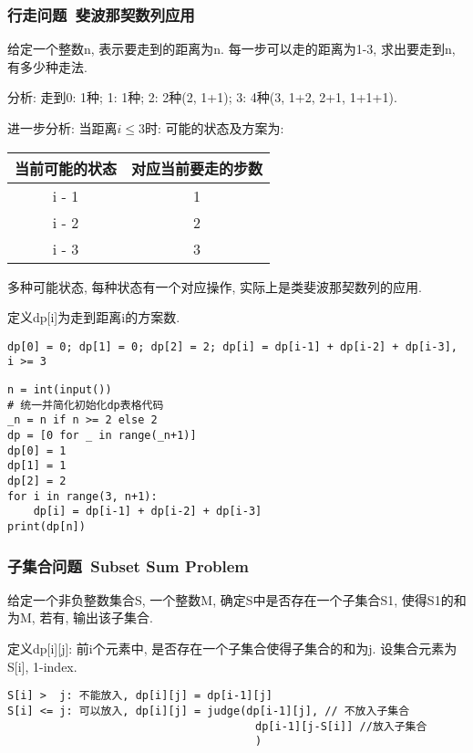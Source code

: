 \documentclass[../main]{subfiles}
\begin{document}
\begin{sloppy}
\subsubsection{行走问题\ 斐波那契数列应用}

给定一个整数n, 表示要走到的距离为n. 每一步可以走的距离为1-3, 求出要走到n, 有多少种走法.

分析: 走到0: 1种; 1: 1种; 2: 2种(2, 1+1); 3: 4种(3, 1+2, 2+1, 1+1+1).

进一步分析: 当距离$i \leq 3$时: 可能的状态及方案为: 
\begin{table}[htbp]
    \centering
    \begin{tabular}{c|c}
        \toprule
        当前可能的状态 & 对应当前要走的步数 \\
        \midrule
        i - 1 & 1 \\
        i - 2 & 2 \\ 
        i - 3 & 3 \\
        \bottomrule
    \end{tabular}
\end{table}

多种可能状态, 每种状态有一个对应操作, 实际上是类斐波那契数列的应用. 

定义dp[i]为走到距离i的方案数. 
\begin{verbatim}
dp[0] = 0; dp[1] = 0; dp[2] = 2; dp[i] = dp[i-1] + dp[i-2] + dp[i-3], i >= 3
\end{verbatim}

\begin{lstlisting}[style = Python]
n = int(input())
# 统一并简化初始化dp表格代码
_n = n if n >= 2 else 2
dp = [0 for _ in range(_n+1)]
dp[0] = 1
dp[1] = 1
dp[2] = 2
for i in range(3, n+1):
    dp[i] = dp[i-1] + dp[i-2] + dp[i-3]
print(dp[n])
\end{lstlisting}

\newpage
\subsubsection{子集合问题\ Subset Sum Problem}

给定一个非负整数集合S, 一个整数M, 确定S中是否存在一个子集合S1, 使得S1的和为M, 若有, 输出该子集合.

定义dp[i][j]: 前i个元素中, 是否存在一个子集合使得子集合的和为j. 设集合元素为S[i], 1-index.
\begin{verbatim}
S[i] >  j: 不能放入, dp[i][j] = dp[i-1][j]
S[i] <= j: 可以放入, dp[i][j] = judge(dp[i-1][j], // 不放入子集合
                                      dp[i-1][j-S[i]] //放入子集合
                                      )
\end{verbatim}


\end{sloppy}
\end{document}
